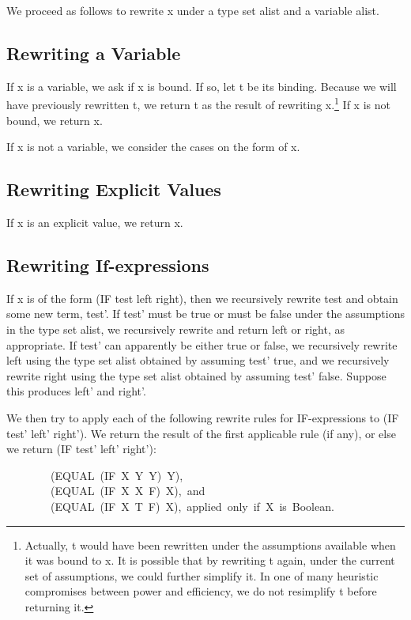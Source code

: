 \documentclass[10pt]{book}
\newenvironment{pubasis}{\begin{flushleft}}{\end{flushleft}}
\begin{document}
We proceed as follows to rewrite x under a type set alist and a variable alist.

\subsection{Rewriting a Variable}
If x is a variable, we ask if x is bound.
If so, let t be its binding.  Because we will have previously rewritten t,
we return t as the result of rewriting x.\footnote{Actually, t would have been rewritten under the assumptions available when it was bound to x.  It is possible that by rewriting t again, under the current set of assumptions, we could further simplify it.  In one of many heuristic compromises between power and efficiency, we do not resimplify t before returning it.}
If x is not bound, we return x.

If x is not a variable, we consider the cases on the form of x.

\subsection{Rewriting Explicit Values}
If x is an explicit value, we return x.

\subsection{Rewriting If-expressions}
If x is of the form (IF test left right), then we recursively rewrite
test and obtain some new term, test'.  If test' must be true or must
be false under the assumptions in the type set alist, we recursively rewrite and return left or right, as appropriate.
If test' can apparently be either true or false,
we recursively rewrite left using the type set alist obtained
by assuming test'
true, and we recursively rewrite right using the type set alist obtained
by assuming test'
false.  Suppose this produces left' and right'.

We then try to apply each of the following rewrite rules for IF-expressions
to (IF test' left' right').  We return the result of the first applicable
rule (if any), or else we return  (IF test' left' right'):

\begin{pubasis}
~~~~~~~~(EQUAL~(IF~X~Y~Y)~Y),\\

~~~~~~~~(EQUAL~(IF~X~X~F)~X),~and\\

~~~~~~~~(EQUAL~(IF~X~T~F)~X),~applied~only~if~X~is~Boolean.\\
\end{pubasis}
\end{document}
